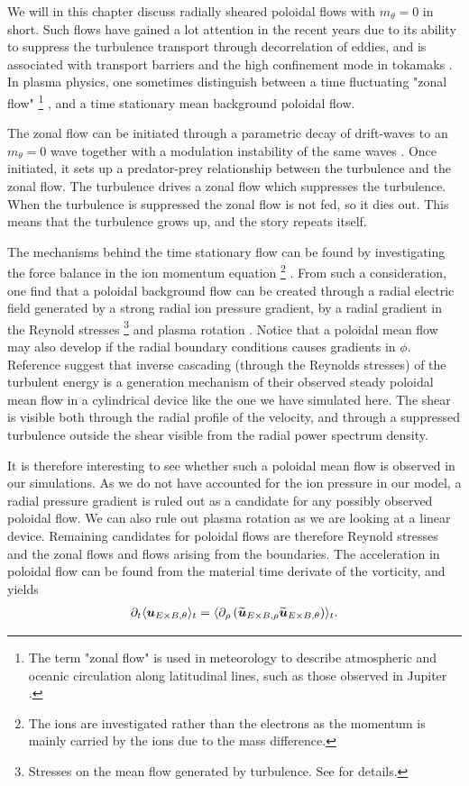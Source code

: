 We will in this chapter discuss radially sheared poloidal flows with $m_\theta = 0$ in short.
Such flows have gained a lot attention in the recent years due to its ability to suppress the turbulence transport through decorrelation of eddies, and is associated with transport barriers and the high confinement mode in tokamaks \cite{Terry2000,Diamond2005a,Viezzer2012Phd}.
In plasma physics, one sometimes distinguish between a time fluctuating "zonal flow"%
\footnote{The term "zonal flow" is used in meteorology to describe atmospheric and oceanic circulation along latitudinal lines, such as those observed in Jupiter \cite{Limaye1986}.}%
, and a time stationary mean background poloidal flow.

The zonal flow can be initiated through a parametric decay of drift-waves to an $m_\theta=0$ wave together with a modulation instability of the same waves \cite{Diamond2005a}.
Once initiated, it sets up a predator-prey relationship between the turbulence and the zonal flow.
The turbulence drives a zonal flow which suppresses the turbulence.
When the turbulence is suppressed the zonal flow is not fed, so it dies out.
This means that the turbulence grows up, and the story repeats itself.

The mechanisms behind the time stationary flow can be found by investigating the force balance in the ion momentum equation%
\footnote{The ions are investigated rather than the electrons as the momentum is mainly carried by the ions due to the mass difference.}%
%
.
From such a consideration, one find that a poloidal background flow can be created through a radial electric field generated by a strong radial ion pressure gradient, by a radial gradient in the Reynold stresses
\footnote{Stresses on the mean flow generated by turbulence.
See \cite{Kundu2010book} for details.}%
and plasma rotation \cite{Terry2000}.
Notice that a poloidal mean flow may also develop if the radial boundary conditions causes gradients in $\phi$.
Reference \cite{Tynan2006a} suggest that inverse cascading (through the Reynolds stresses) of the turbulent energy is a generation mechanism of their observed steady poloidal mean flow in a cylindrical device like the one we have simulated here.
The shear is visible both through the radial profile of the velocity, and through a suppressed turbulence outside the shear visible from the radial power spectrum density.

It is therefore interesting to see whether such a poloidal mean flow is observed in our simulations.
As we do not have accounted for the ion pressure in our model, a radial pressure gradient is ruled out as a candidate for any possibly observed poloidal flow.
We can also rule out plasma rotation as we are looking at a linear device.
Remaining candidates for poloidal flows are therefore Reynold stresses and the zonal flows and flows arising from the boundaries.
The acceleration in poloidal flow can be found from the material time derivate of the vorticity, and yields \cite{Diamond1991}
%
\begin{align*}
    \partial_t \langle{\boldsymbol{u}_{E\times B,\theta}}\rangle_t = \langle{\partial_\rho\left(\widetilde{ \boldsymbol{u}}_{E\times B,\rho}\widetilde{ \boldsymbol{u}}_{E\times B,\theta}\right)}\rangle_t.
\end{align*}
%

